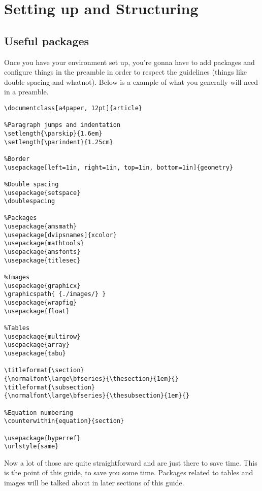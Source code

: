 %
%
%
%
%
\section{Setting up and Structuring}
\subsection{Useful packages}
Once you have your environment set up,
you're gonna have to add packages and configure things
in the preamble in order to respect the guidelines
(things like double spacing and whatnot).
Below is a example of what you generally will need in a preamble.
\begin{verbatim}
\documentclass[a4paper, 12pt]{article}

%Paragraph jumps and indentation
\setlength{\parskip}{1.6em}
\setlength{\parindent}{1.25cm}

%Border
\usepackage[left=1in, right=1in, top=1in, bottom=1in]{geometry}

%Double spacing
\usepackage{setspace}
\doublespacing

%Packages
\usepackage{amsmath}
\usepackage[dvipsnames]{xcolor}
\usepackage{mathtools}
\usepackage{amsfonts}
\usepackage{titlesec}

%Images
\usepackage{graphicx}
\graphicspath{ {./images/} }
\usepackage{wrapfig}
\usepackage{float}

%Tables
\usepackage{multirow}
\usepackage{array}
\usepackage{tabu}

\titleformat{\section}
{\normalfont\large\bfseries}{\thesection}{1em}{}
\titleformat{\subsection}
{\normalfont\large\bfseries}{\thesubsection}{1em}{}

%Equation numbering
\counterwithin{equation}{section}

\usepackage{hyperref}
\urlstyle{same}
\end{verbatim}
Now a lot of those are quite straightforward and are just there to save time.
This is the point of this guide, to save you some time.
Packages related to tables and images will be talked about in later sections of this guide.

